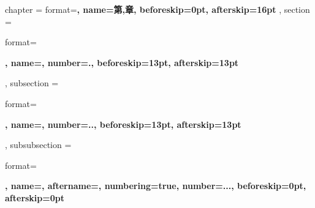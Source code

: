 \ctexset
{
    chapter = 
    {
        format=\centering{}\bfseries,
        name={第,章},
        beforeskip=0pt,
        afterskip=16pt
    },
    section =
    {
        format=\raggedright{}\bfseries,
        name={},
        number=.,
        beforeskip=13pt,
        afterskip=13pt
    },
    subsection =
    {
        format=\raggedright{}\bfseries,
        name={},
        number=..,
        beforeskip=13pt,
        afterskip=13pt
    },
    subsubsection =
    {
        format=\raggedright{}\bfseries,
        name={},
        aftername=\quad,
        numbering=true,
        number=...,
        beforeskip=0pt,
        afterskip=0pt
    }
}
